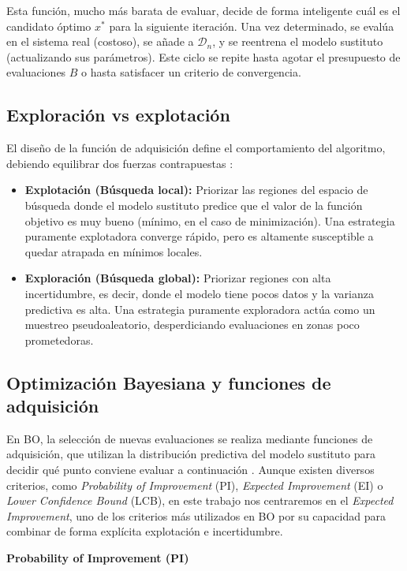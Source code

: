 Esta función, mucho más barata de evaluar, decide de forma inteligente cuál es el candidato óptimo $x^*$ para la siguiente iteración. Una vez determinado, se evalúa en el sistema real (costoso), se añade a $\mathcal{D}_n$, y se reentrena el modelo sustituto (actualizando sus parámetros). Este ciclo se repite hasta agotar el presupuesto de evaluaciones $B$ o hasta satisfacer un criterio de convergencia.

\subsection{Exploración vs explotación}
El diseño de la función de adquisición define el comportamiento del algoritmo, debiendo equilibrar dos fuerzas contrapuestas \cite{jiang2020surrogate}:
\begin{itemize}
    \item \textbf{Explotación (Búsqueda local):} Priorizar las regiones del espacio de búsqueda donde el modelo sustituto predice que el valor de la función objetivo es muy bueno (mínimo, en el caso de minimización). Una estrategia puramente explotadora converge rápido, pero es altamente susceptible a quedar atrapada en mínimos locales.
    \item \textbf{Exploración (Búsqueda global):} Priorizar regiones con alta incertidumbre, es decir, donde el modelo tiene pocos datos y la varianza predictiva es alta. Una estrategia puramente exploradora actúa como un muestreo pseudoaleatorio, desperdiciando evaluaciones en zonas poco prometedoras.
\end{itemize}

\subsection{Optimización Bayesiana y funciones de adquisición}

En BO, la selección de nuevas evaluaciones se realiza mediante
funciones de adquisición, que utilizan la distribución predictiva del modelo sustituto para
decidir qué punto conviene evaluar a continuación \cite{jones1998efficient}. Aunque existen
diversos criterios, como \textit{Probability of Improvement} (PI), \textit{Expected Improvement}
(EI) o \textit{Lower Confidence Bound} (LCB), en este trabajo nos centraremos en el
\textit{Expected Improvement}, uno de los criterios más utilizados en BO
por su capacidad para combinar de forma explícita explotación e incertidumbre.

\vspace{0.3cm}
\noindent\textbf{Probability of Improvement (PI)} \\

